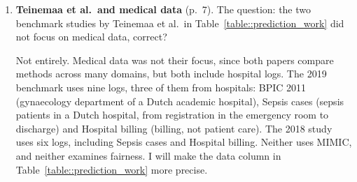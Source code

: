 \begin{enumerate}
  \item \textbf{Teinemaa et al.\ and medical data} (p.~7). The question: the two benchmark studies by Teinemaa et al.\ in Table~\ref{table::prediction_work} did not focus on medical data, correct?

  Not entirely. Medical data was not their focus, since both papers compare methods across many domains, but both include hospital logs. The 2019 benchmark uses nine logs, three of them from hospitals: BPIC 2011 (gynaecology department of a Dutch academic hospital), Sepsis cases (sepsis patients in a Dutch hospital, from registration in the emergency room to discharge) and Hospital billing (billing, not patient care). The 2018 study uses six logs, including Sepsis cases and Hospital billing. Neither uses MIMIC, and neither examines fairness. I will make the data column in Table~\ref{table::prediction_work} more precise.
\end{enumerate}
